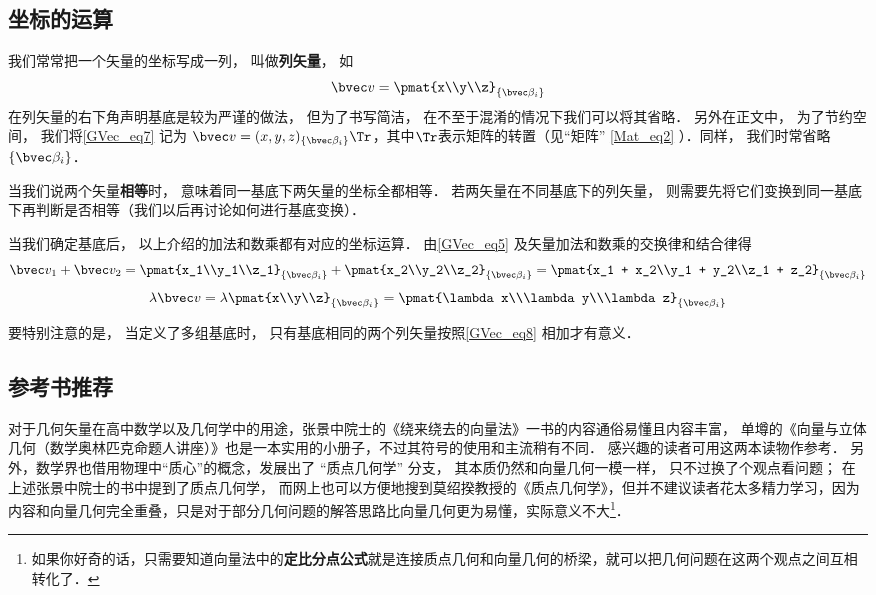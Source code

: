 \subsection{坐标的运算}
我们常常把一个矢量的坐标写成一列， 叫做\textbf{列矢量}， 如
\begin{equation}\label{GVec_eq7}
\bvec v = \pmat{x\\y\\z}_{\{\bvec\beta_i\}}
\end{equation}
在列矢量的右下角声明基底是较为严谨的做法， 但为了书写简洁， 在不至于混淆的情况下我们可以将其省略． 另外在正文中， 为了节约空间， 我们将\autoref{GVec_eq7} 记为 $\bvec v = (x, y, z)_{\{\bvec\beta_i\}}\Tr$，其中$\Tr$表示矩阵的转置（见“矩阵” \autoref{Mat_eq2} ）．同样， 我们时常省略 $\{\bvec\beta_i\}$．

当我们说两个矢量\textbf{相等}时， 意味着同一基底下两矢量的坐标全都相等． 若两矢量在不同基底下的列矢量， 则需要先将它们变换到同一基底下再判断是否相等（我们以后再讨论如何进行基底变换）．

当我们确定基底后， 以上介绍的加法和数乘都有对应的坐标运算． 由\autoref{GVec_eq5} 及矢量加法和数乘的交换律和结合律得
\begin{equation}\label{GVec_eq8}
\bvec v_1 + \bvec v_2 = \pmat{x_1\\y_1\\z_1}_{\{\bvec\beta_i\}} + \pmat{x_2\\y_2\\z_2}_{\{\bvec\beta_i\}} = \pmat{x_1 + x_2\\y_1 + y_2\\z_1 + z_2}_{\{\bvec\beta_i\}}
\end{equation}
\begin{equation}\label{GVec_eq9}
\lambda \bvec v = \lambda\pmat{x\\y\\z}_{\{\bvec\beta_i\}} = \pmat{\lambda x\\\lambda y\\\lambda z}_{\{\bvec\beta_i\}}
\end{equation}

要特别注意的是， 当定义了多组基底时， 只有基底相同的两个列矢量按照\autoref{GVec_eq8} 相加才有意义．

\subsection{参考书推荐}
对于几何矢量在高中数学以及几何学中的用途，张景中院士的《绕来绕去的向量法》一书的内容通俗易懂且内容丰富， 单墫的《向量与立体几何（数学奥林匹克命题人讲座）》也是一本实用的小册子，不过其符号的使用和主流稍有不同． 感兴趣的读者可用这两本读物作参考． 另外，数学界也借用物理中“质心”的概念，发展出了 “质点几何学” 分支， 其本质仍然和向量几何一模一样， 只不过换了个观点看问题； 在上述张景中院士的书中提到了质点几何学， 而网上也可以方便地搜到莫绍揆教授的《质点几何学》，但并不建议读者花太多精力学习，因为内容和向量几何完全重叠，只是对于部分几何问题的解答思路比向量几何更为易懂，实际意义不大\footnote{如果你好奇的话，只需要知道向量法中的\textbf{定比分点公式}就是连接质点几何和向量几何的桥梁，就可以把几何问题在这两个观点之间互相转化了．}．

